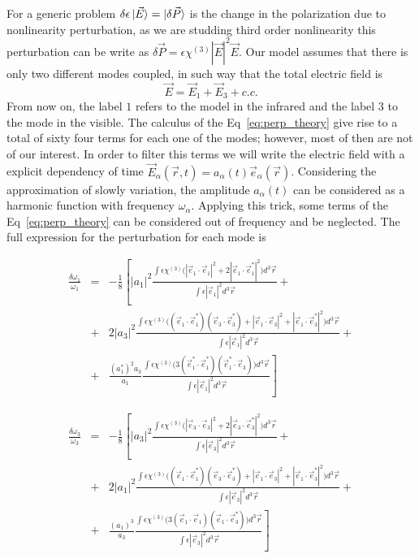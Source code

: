 For a generic problem $\delta\epsilon\ket{\vec{E}}=\ket{\delta\vec{P}}$ is the change in the polarization due to nonlinearity perturbation, as we are studding third order nonlinearity this perturbation can be write as $\delta\vec{P} = \epsilon\chi^{(3)}|\vec{E}|^2\vec{E}$. Our model assumes that there is only two different modes coupled, in such way that the total electric field is
\begin{equation}
    \vec{E} = \vec{E}_1+\vec{E}_3+c.c.
\end{equation}
From now on, the label $1$ refers to the model in the infrared and the label $3$ to the mode in the visible. 
The calculus of the Eq~\ref{eq:perp_theory} give rise to a total of sixty four terms for each one of the modes; however, most of then are not of our interest. In order to filter this terms we will write the electric field with a explicit dependency of time $\vec{E}_\alpha(\vec{r},t) = a_\alpha(t) \vec{e}_\alpha(\vec{r})$. Considering the approximation of slowly variation, the amplitude $a_\alpha(t)$ can be considered as a harmonic function with frequency $\omega_\alpha$. Applying this trick, some terms of the Eq~\ref{eq:perp_theory} can be considered out of frequency and be neglected. The full expression for the perturbation for each mode is

\begin{eqnarray}
\frac{\delta\omega_1}{\omega_1} &=& -\frac{1}{8}\left[|a_1|^2\frac{\int\epsilon\chi^{(3)}
\Big(|\vec{e}_1\cdot\vec{e}_1|^2 + 2|\vec{e}_1\cdot\vec{e}_1^*|^2
\Big)d^3\vec{r}}
{\int \epsilon|\vec{e}_1|^2 d^3\vec{r}}\right. +\nonumber\\
&+&2|a_3|^2\frac{\int\epsilon\chi^{(3)}
\Big((\vec{e}_1\cdot\vec{e}_1^*)(\vec{e}_3\cdot\vec{e}_3^*)+|\vec{e}_1\cdot\vec{e}_3|^2+|\vec{e}_1\cdot\vec{e}^*_3|^2
\Big)d^3\vec{r}}
{\int \epsilon|\vec{e}_1|^2 d^3\vec{r}}+\nonumber\\
&+&\left.\frac{(a^*_1)^2a_3}{a_1}\frac{\int\epsilon\chi^{(3)}
\Big(3(\vec{e}^*_1\cdot\vec{e}_1^*)(\vec{e}^*_1\cdot\vec{e}_3)
\Big)d^3\vec{r}}
{\int \epsilon|\vec{e}_1|^2 d^3\vec{r}}\right]
\end{eqnarray}

\begin{eqnarray}
\frac{\delta\omega_3}{\omega_3} &=& -\frac{1}{8}\left[|a_3|^2\frac{\int\epsilon\chi^{(3)}
\Big(|\vec{e}_3\cdot\vec{e}_3|^2 + 2|\vec{e}_3\cdot\vec{e}_3^*|^2
\Big)d^3\vec{r}}
{\int \epsilon|\vec{e}_3|^2 d^3\vec{r}}\right. +\nonumber\\
&+&2|a_1|^2\frac{\int\epsilon\chi^{(3)}
\Big((\vec{e}_1\cdot\vec{e}_1^*)(\vec{e}_3\cdot\vec{e}_3^*)+|\vec{e}_1\cdot\vec{e}_3|^2+|\vec{e}_1\cdot\vec{e}^*_3|^2
\Big)d^3\vec{r}}
{\int \epsilon|\vec{e}_3|^2 d^3\vec{r}}+\nonumber\\
&+&\left.\frac{(a_1)^3}{a_3}\frac{\int\epsilon\chi^{(3)}
\Big(3(\vec{e}_1\cdot\vec{e}_1)(\vec{e}_1\cdot\vec{e}^*_3)
\Big)d^3\vec{r}}
{\int \epsilon|\vec{e}_3|^2 d^3\vec{r}}\right]
\end{eqnarray}

